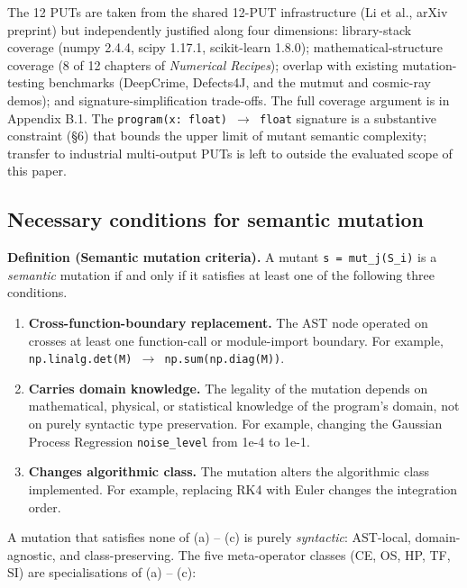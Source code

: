 \documentclass[manuscript,screen,review]{acmart}
\begin{document}
The 12 PUTs are taken from the shared 12-PUT infrastructure (Li et al., arXiv preprint) but
independently justified along four dimensions: library-stack coverage
(numpy 2.4.4, scipy 1.17.1, scikit-learn 1.8.0); mathematical-structure
coverage (8 of 12 chapters of \emph{Numerical Recipes}); overlap with
existing mutation-testing benchmarks (DeepCrime, Defects4J, and the
mutmut and cosmic-ray demos); and signature-simplification trade-offs.
The full coverage argument is in Appendix B.1. The
\texttt{program(x:\ float)\ $\to$\ float} signature is a substantive
constraint (§6) that bounds the upper limit of mutant semantic
complexity; transfer to industrial multi-output PUTs is left to
outside the evaluated scope of this paper.

\subsection{Necessary conditions for semantic mutation}\label{necessary-conditions-for-semantic-mutation-layer-1}

\textbf{Definition (Semantic mutation criteria).} A mutant
\texttt{s\textquotesingle{}\ =\ mut\_j(S\_i)} is a \emph{semantic}
mutation if and only if it satisfies at least one of the following three
conditions.

\begin{enumerate}[label=(\alph*)]
\item
  \textbf{Cross-function-boundary replacement.} The AST node operated on
  crosses at least one function-call or module-import boundary. For
  example, \texttt{np.linalg.det(M)\ $\to$\ np.sum(np.diag(M))}.
\item
  \textbf{Carries domain knowledge.} The legality of the mutation
  depends on mathematical, physical, or statistical knowledge of the
  program's domain, not on purely syntactic type preservation. For
  example, changing the Gaussian Process Regression
  \texttt{noise\_level} from 1e-4 to 1e-1.
\item
  \textbf{Changes algorithmic class.} The mutation alters the
  algorithmic class implemented. For example, replacing RK4 with Euler
  changes the integration order.
\end{enumerate}

A mutation that satisfies none of (a) -- (c) is purely \emph{syntactic}:
AST-local, domain-agnostic, and class-preserving. The five meta-operator
classes (CE, OS, HP, TF, SI) are specialisations of (a) -- (c):
\end{document}
